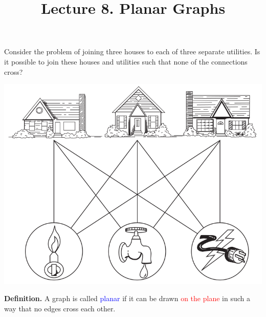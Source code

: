 \documentclass[aspectratio=169]{beamer}
\title{Lecture 8. Planar Graphs}
\date{ }
\providecommand{\Blue}[1]{\textcolor{blue}{#1}}
\providecommand{\Red}[1]{\textcolor{red}{#1}}
\begin{document}
\frame[plain]{\titlepage}

\begin{frame}[plain]{}

Consider the problem of joining three houses to each of three separate utilities.
 Is it possible to join these houses and utilities such that none of the connections cross?
 
 \begin{center}
  \includegraphics[width=.5\textwidth,height=.5\textheight]{./img/lecture8-fig1.png}
 \end{center}
 
 \pause
 
 \medskip
 
 {\bf Definition.} A graph is called \Blue{planar} if it can be drawn \Red{on the plane} 
    in such a way that no edges cross each other. 
\end{frame}
\end{document}
